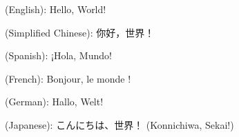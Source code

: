 \documentclass{article}
\begin{document}
(English):
Hello, World!

(Simplified Chinese):
你好，世界！

(Spanish):
¡Hola, Mundo!

(French):
Bonjour, le monde !

(German):
Hallo, Welt!

(Japanese):
こんにちは、世界！ (Konnichiwa, Sekai!)
\end{document}
